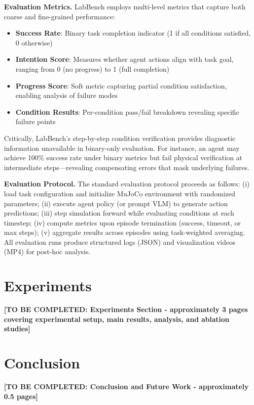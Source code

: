 \documentclass[letterpaper]{article} %
\begin{document}
\textbf{Evaluation Metrics.} LabBench employs multi-level metrics that capture both coarse and fine-grained performance:

\begin{itemize}
    \item \textbf{Success Rate}: Binary task completion indicator (1 if all conditions satisfied, 0 otherwise)
    \item \textbf{Intention Score}: Measures whether agent actions align with task goal, ranging from 0 (no progress) to 1 (full completion)
    \item \textbf{Progress Score}: Soft metric capturing partial condition satisfaction, enabling analysis of failure modes
    \item \textbf{Condition Results}: Per-condition pass/fail breakdown revealing specific failure points
\end{itemize}

Critically, LabBench's step-by-step condition verification provides diagnostic information unavailable in binary-only evaluation. For instance, an agent may achieve 100\% success rate under binary metrics but fail physical verification at intermediate steps---revealing compensating errors that mask underlying failures.

\textbf{Evaluation Protocol.} The standard evaluation protocol proceeds as follows: (i) load task configuration and initialize MuJoCo environment with randomized parameters; (ii) execute agent policy (or prompt VLM) to generate action predictions; (iii) step simulation forward while evaluating conditions at each timestep; (iv) compute metrics upon episode termination (success, timeout, or max steps); (v) aggregate results across episodes using task-weighted averaging. All evaluation runs produce structured logs (JSON) and visualization videos (MP4) for post-hoc analysis.

\section{Experiments}
\label{sec:experiments}

\textbf{[TO BE COMPLETED: Experiments Section - approximately 3 pages covering experimental setup, main results, analysis, and ablation studies]}

\section{Conclusion}
\label{sec:conclusion}

\textbf{[TO BE COMPLETED: Conclusion and Future Work - approximately 0.5 pages]}



\end{document}
